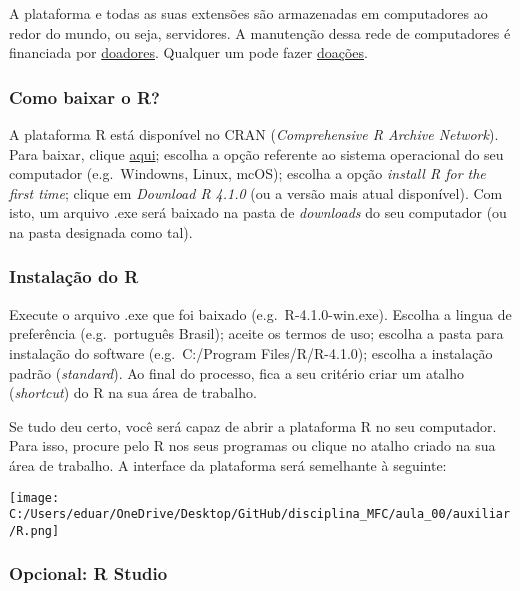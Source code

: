 \documentclass[
]{article}
\begin{document}
A plataforma e todas as suas extensões são armazenadas em computadores
ao redor do mundo, ou seja, servidores. A manutenção dessa rede de
computadores é financiada por
\href{https://www.r-project.org/foundation/donors.html}{doadores}.
Qualquer um pode fazer
\href{https://www.r-project.org/foundation/donations.html}{doações}.

\hypertarget{como-baixar-o-r}{%
\subsubsection{Como baixar o R?}\label{como-baixar-o-r}}

A plataforma R está disponível no CRAN (\emph{Comprehensive R Archive
Network}). Para baixar, clique \href{https://cran.r-project.org/}{aqui};
escolha a opção referente ao sistema operacional do seu computador
(e.g.~Windowns, Linux, mcOS); escolha a opção \emph{install R for the
first time}; clique em \emph{Download R 4.1.0} (ou a versão mais atual
disponível). Com isto, um arquivo .exe será baixado na pasta de
\emph{downloads} do seu computador (ou na pasta designada como tal).

\hypertarget{instalauxe7uxe3o-do-r}{%
\subsubsection{Instalação do R}\label{instalauxe7uxe3o-do-r}}

Execute o arquivo .exe que foi baixado (e.g.~R-4.1.0-win.exe). Escolha a
lingua de preferência (e.g.~português Brasil); aceite os termos de uso;
escolha a pasta para instalação do software (e.g.~C:/Program
Files/R/R-4.1.0); escolha a instalação padrão (\emph{standard}). Ao
final do processo, fica a seu critério criar um atalho (\emph{shortcut})
do R na sua área de trabalho.

Se tudo deu certo, você será capaz de abrir a plataforma R no seu
computador. Para isso, procure pelo R nos seus programas ou clique no
atalho criado na sua área de trabalho. A interface da plataforma será
semelhante à seguinte:

\texttt{[image: C:/Users/eduar/OneDrive/Desktop/GitHub/disciplina\_MFC/aula\_00/auxiliar/R.png]}

\hypertarget{opcional-r-studio}{%
\subsubsection{Opcional: R Studio}\label{opcional-r-studio}}
\end{document}
